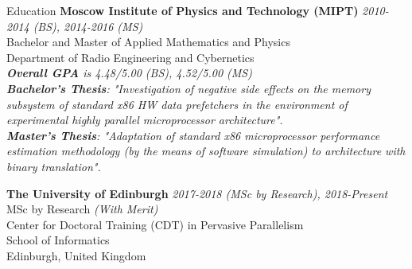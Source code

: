 \documentclass{resume} %
\begin{document}

\begin{rSection}{Education}
{\bf {\large Moscow Institute of Physics and Technology (MIPT)}} \hfill {\em 2010-2014 (BS), 2014-2016 (MS)} 
\\ Bachelor and Master of Applied Mathematics and Physics
\\ Department of Radio Engineering and Cybernetics
\\ {\small \textit{\textbf{Overall GPA} is 4.48/5.00 (BS), 4.52/5.00 (MS)}
\\ \textit{\textbf{Bachelor's Thesis}: "Investigation of negative side effects on the memory subsystem of standard x86 HW data prefetchers in the environment of experimental highly parallel microprocessor architecture".}
\\ \textit{\textbf{Master's Thesis}: "Adaptation of standard x86 microprocessor performance estimation methodology (by the means of software simulation) to architecture with binary translation".}}


{\bf {\large The University of Edinburgh}} \hfill {\em 2017-2018 (MSc by Research), 2018-Present} 
\\ MSc by Research \textit{(With Merit)}
\\ Center for Doctoral Training (CDT) in Pervasive Parallelism
\\ School of Informatics
\\ Edinburgh, United Kingdom

\end{rSection}
\end{document}
